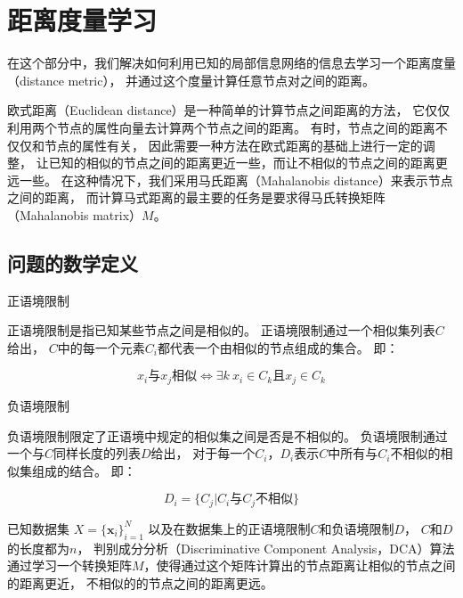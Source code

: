 
\chapter{距离度量学习}
\label{chap:dca}

在这个部分中，我们解决如何利用已知的局部信息网络的信息去学习一个距离度量（distance metric），
并通过这个度量计算任意节点对之间的距离。

欧式距离（Euclidean distance）是一种简单的计算节点之间距离的方法，
它仅仅利用两个节点的属性向量去计算两个节点之间的距离。
有时，节点之间的距离不仅仅和节点的属性有关，
因此需要一种方法在欧式距离的基础上进行一定的调整，
让已知的相似的节点之间的距离更近一些，而让不相似的节点之间的距离更远一些。
在这种情况下，我们采用马氏距离（Mahalanobis distance）来表示节点之间的距离，
而计算马式距离的最主要的任务是要求得马氏转换矩阵（Mahalanobis matrix）$M$。

\section{问题的数学定义}
\label{sec:dcadef}

\begin{defn}{正语境限制}
\label{defn:posconstraints}

    正语境限制是指已知某些节点之间是相似的。
    正语境限制通过一个相似集列表$C$给出，
    $C$中的每一个元素$C_i$都代表一个由相似的节点组成的集合。
    即：

    $$
    x_i\text{与}x_j\text{相似} \Longleftrightarrow \exists k \ x_i \in C_k \text{且} x_j \in C_k 
    $$

\end{defn}

\begin{defn}{负语境限制}
\label{defn:negconstraints}

    负语境限制限定了正语境中规定的相似集之间是否是不相似的。
    负语境限制通过一个与$C$同样长度的列表$D$给出，
    对于每一个$C_i$，$D_i$表示$C$中所有与$C_i$不相似的相似集组成的结合。
    即：

    $$
    D_i = \{C_j | C_i \text{与} C_j \text{不相似} \}
    $$

\end{defn}


已知数据集
$X = \{ \bm{x}_i \}_{i=1}^{N}$
以及在数据集上的正语境限制$C$和负语境限制$D$，
$C$和$D$的长度都为$n$，
判别成分分析（Discriminative Component Analysis，DCA）算法
通过学习一个转换矩阵$M$，使得通过这个矩阵计算出的节点距离让相似的节点之间的距离更近，
不相似的的节点之间的距离更远。

